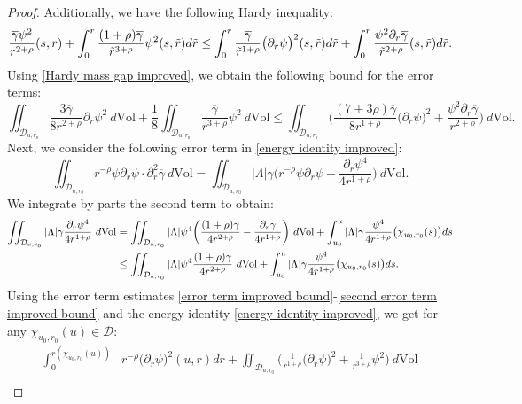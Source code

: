 \documentclass[11pt]{article}
\numberwithin{equation}{section}
\begin{document}
\begin{proof}
    Additionally, we have the following Hardy inequality:
    \begin{equation}\label{Hardy mass gap improved}
        \frac{\overline{\gamma}\psi^2}{r^{2+\rho}}(s,r)+\int_0^r\frac{(1+\rho)\overline{\gamma}}{\Tilde{r}^{3+\rho}}\psi^2(s,\Tilde{r})d\Tilde{r}\leq\int_0^r\frac{\overline{\gamma}}{\Tilde{r}^{1+\rho}}\big(\partial_r\psi\big)^2(s,\Tilde{r})d\Tilde{r}+\int_0^r\frac{\psi^2\partial_r\overline{\gamma}}{\Tilde{r}^{2+\rho}}(s,\Tilde{r})d\Tilde{r}.
    \end{equation}
    Using \eqref{Hardy mass gap improved}, we obtain the following bound for the error terms:
    \begin{equation}\label{error term improved bound}
        \iint_{\mathcal{D}_{u,r_0}}\frac{3\overline{\gamma}}{8r^{2+\rho}}\partial_r\psi^2\ d\mathrm{Vol}+\frac{1}{8}\iint_{\mathcal{D}_{u,r_0}}\frac{\overline{\gamma}}{r^{3+\rho}}\psi^2\ d\mathrm{Vol}\leq\iint_{\mathcal{D}_{u,r_0}}\bigg(\frac{(7+3\rho)\overline{\gamma}}{8r^{1+\rho}}\big(\partial_r\psi\big)^2+\frac{\psi^2\partial_r\overline{\gamma}}{r^{2+\rho}}\bigg)\ d\mathrm{Vol}.
    \end{equation}
    Next, we consider the following error term in \eqref{energy identity improved}:
    \[\iint_{\mathcal{D}_{u,r_0}}r^{-\rho}\psi\partial_r\psi\cdot\partial_r^2\overline{\gamma}\ d\mathrm{Vol}=\iint_{\mathcal{D}_{u,r_0}}|\Lambda|\gamma\bigg(r^{-\rho}\psi\partial_r\psi+\frac{\partial_r\psi^4}{4r^{1+\rho}}\bigg)\ d\mathrm{Vol}.\]
    We integrate by parts the second term to obtain:
    \begin{align}
    \iint_{\mathcal{D}_{u,r_0}}|\Lambda|\gamma\frac{\partial_r\psi^4}{4r^{1+\rho}}\ d\mathrm{Vol}&=\iint_{\mathcal{D}_{u,r_0}}|\Lambda|\psi^4\bigg(\frac{(1+\rho)\gamma}{4r^{2+\rho}}-\frac{\partial_r\gamma}{4r^{1+\rho}}\bigg)\ d\mathrm{Vol}+\int_{u_0}^u|\Lambda|\gamma\frac{\psi^4}{4r^{1+\rho}}\big(\chi_{u_0,r_0}(s)\big)ds\label{second error term improved bound}\\
    &\leq\iint_{\mathcal{D}_{u,r_0}}|\Lambda|\psi^4\frac{(1+\rho)\gamma}{4r^{2+\rho}}\ d\mathrm{Vol}+\int_{u_0}^u|\Lambda|\gamma\frac{\psi^4}{4r^{1+\rho}}\big(\chi_{u_0,r_0}(s)\big)ds.\notag
\end{align}
Using the error term estimates \eqref{error term improved bound}-\eqref{second error term improved bound} and the energy identity \eqref{energy identity improved}, we get for any $\chi_{u_0,r_0}(u)\in\mathcal{D}$:
\begin{align*}
    \int_0^{r(\chi_{u_0,r_0}(u))}&r^{-\rho}\big(\partial_r\psi\big)^2(u,r)dr+\iint_{\mathcal{D}_{u,r_0}}\bigg(\frac{1}{r^{1+\rho}}\big(\partial_r\psi\big)^2+\frac{1}{r^{3+\rho}}\psi^2\bigg)\ d\mathrm{Vol}\\

\end{align*}
\end{proof}
\end{document}
